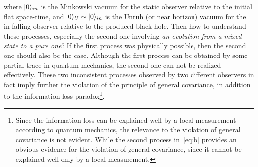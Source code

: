 \documentclass[12pt,a4paper]{article}
\begin{document}
where $\arrowvert0\rangle_{in}$ is the Minkowski vacuum for the static observer relative to the initial flat space-time, and $\arrowvert
0\rangle_{U}\sim\arrowvert0\rangle_{in}$ is the Unruh (or near horizon) vacuum for the in-falling observer relative to the produced black hole. Then how to understand these processes, especially the second one involving \emph{an evolution from a mixed state to a pure one}? If the first process was physically possible, then the second one should also be the case. Although the first process can be obtained by some partial trace in quantum mechanics, the second one can not be realized effectively. These two inconsistent processes observed by two different observers in fact imply further the violation of the principle of general covariance, in addition to the information loss paradox\footnote{Since the information loss can be explained well by a local measurement according to quantum mechanics, the relevance to the violation of general covariance is not evident. While the second process in~\eqref{eq:b} provides an obvious evidence for the violation of general covariance, since it cannot be explained well only by a local measurement.}.
\end{document}
